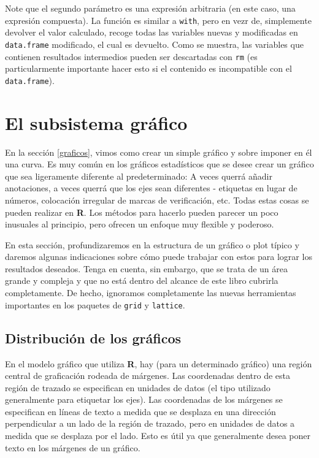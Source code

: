 Note que el segundo parámetro es una expresión arbitraria (en este caso, una
expresión compuesta). La función es similar a \texttt{with}, pero en vezr de,
simplemente devolver el valor calculado, recoge todas las variables nuevas y
modificadas en \texttt{data.frame} modificado, el cual es devuelto.  Como se
muestra, las variables que contienen resultados intermedios pueden ser
descartadas con \texttt{rm} (es particularmente importante hacer esto si el
contenido es incompatible con el \texttt{data.frame}).

\section{El subsistema gráfico}

En la sección \ref{graficos}, vimos como crear un simple gráfico y sobre imponer
en él una curva.  Es muy común en los gráficos estadísticos que se desee crear un
gráfico que sea ligeramente diferente al predeterminado: A veces querrá añadir
anotaciones, a veces querrá que los ejes sean diferentes - etiquetas en lugar de
números, colocación irregular de marcas de verificación, etc. Todas estas cosas
se pueden realizar en \textbf{R}. Los métodos para hacerlo pueden parecer un poco
inusuales al principio, pero ofrecen un enfoque muy flexible y poderoso.

En esta sección, profundizaremos en la estructura de un gráfico o plot típico
y daremos algunas indicaciones sobre cómo puede trabajar con estos para lograr
los resultados deseados.  Tenga en cuenta, sin embargo, que se trata de un área
grande y compleja y que no está dentro del alcance de este libro cubrirla
completamente. De hecho, ignoramos completamente las nuevas herramientas
importantes en los paquetes de \texttt{grid} y \texttt{lattice}.

\subsection{Distribución de los gráficos}

En el modelo gráfico que utiliza \textbf{R}, hay (para un determinado gráfico)
una región central de graficación rodeada de márgenes. Las coordenadas dentro de
esta región de trazado se especifican en unidades de datos (el tipo utilizado
generalmente para etiquetar los ejes). Las coordenadas de los márgenes se
especifican en líneas de texto a medida que se desplaza en una dirección
perpendicular a un lado de la región de trazado, pero en unidades de datos a
medida que se desplaza por el lado. Esto es útil ya que generalmente desea poner
texto en los márgenes de un gráfico.

